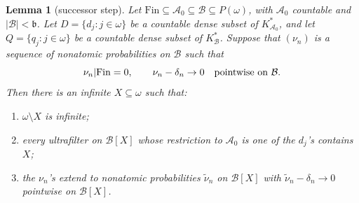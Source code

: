 \documentclass[11pt]{amsart}
\newtheorem{lemma}[theorem]{Lemma}
\theoremstyle{definition}
\newcommand{\A}{\mathcal A}
\newcommand{\B}{\mathcal B}
\newcommand{\Fin}{\mathrm{Fin}}
\newcommand{\bb}{\mathfrak b}
\begin{document}
\begin{lemma}[successor step]\label{lem:successor}
Let \(\Fin\subseteq\A_0\subseteq\B\subseteq P(\omega)\), with \(\A_0\)
countable and \(|\B|<\bb\).  Let \(D=\{d_j:j\in\omega\}\) be a countable dense
subset of \(K_{\A_0}^*\), and let \(Q=\{q_j:j\in\omega\}\) be a countable dense
subset of \(K_\B^*\).  Suppose that \((\nu_n)\) is a sequence of nonatomic
probabilities on \(\B\) such that
\[
        \nu_n|\Fin=0,\qquad
        \nu_n-\delta_n\to0
        \quad\hbox{pointwise on }\B .
\]
Then there is an infinite \(X\subseteq\omega\) such that:
\begin{enumerate}[label=(\roman*)]
\item \(\omega\setminus X\) is infinite;
\item every ultrafilter on \(\B[X]\) whose restriction to \(\A_0\) is one of
the \(d_j\)'s contains \(X\);
\item the \(\nu_n\)'s extend to nonatomic probabilities
\(\widetilde\nu_n\) on \(\B[X]\) with
\(\widetilde\nu_n-\delta_n\to0\) pointwise on \(\B[X]\).
\end{enumerate}
\end{lemma}
\end{document}
